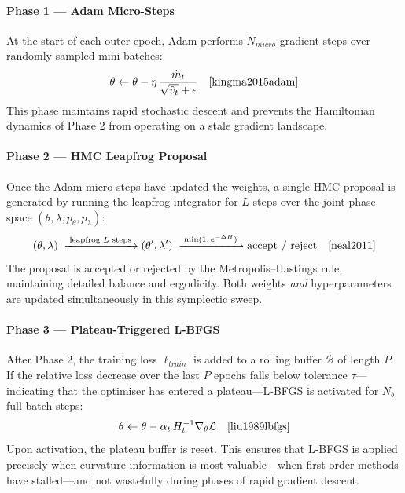 \documentclass[11pt]{article}
\begin{document}
\paragraph{Phase 1 — Adam Micro-Steps}
At the start of each outer epoch, Adam performs $N_{micro}$
gradient steps over randomly sampled mini-batches:
\begin{equation}
\theta \leftarrow \theta - \eta\,\frac{\hat{m}_t}{\sqrt{\hat{v}_t}+\epsilon}
\quad \cite{kingma2015adam}
\end{equation}
This phase maintains rapid stochastic descent and prevents the
Hamiltonian dynamics of Phase 2 from operating on a stale gradient
landscape.

\paragraph{Phase 2 — HMC Leapfrog Proposal}
Once the Adam micro-steps have updated the weights, a single HMC
proposal is generated by running the leapfrog integrator for $L$
steps over the joint phase space $(\theta, \lambda, p_\theta, p_\lambda)$:
\begin{equation}
(\theta,\lambda)
\;\xrightarrow{\;\text{leapfrog }L\text{ steps}\;}
(\theta',\lambda')
\;\xrightarrow{\;\min(1,\,e^{-\Delta H})\;}
\text{accept / reject}
\quad \cite{neal2011}
\end{equation}
The proposal is accepted or rejected by the Metropolis--Hastings rule,
maintaining detailed balance and ergodicity.  Both weights \emph{and}
hyperparameters are updated simultaneously in this symplectic sweep.

\paragraph{Phase 3 — Plateau-Triggered L-BFGS}
After Phase 2, the training loss $\ell_{train}$ is added to a rolling
buffer $\mathcal{B}$ of length $P$.  If the relative loss decrease over
the last $P$ epochs falls below tolerance $\tau$—indicating that the
optimiser has entered a plateau—L-BFGS is activated for $N_b$ full-batch
steps:
\begin{equation}
\theta \leftarrow \theta - \alpha_t\,H_t^{-1}\nabla_\theta\mathcal{L}
\quad \cite{liu1989lbfgs}
\end{equation}
Upon activation, the plateau buffer is reset.  This ensures that
L-BFGS is applied precisely when curvature information is most
valuable—when first-order methods have stalled—and not wastefully
during phases of rapid gradient descent.
\end{document}
